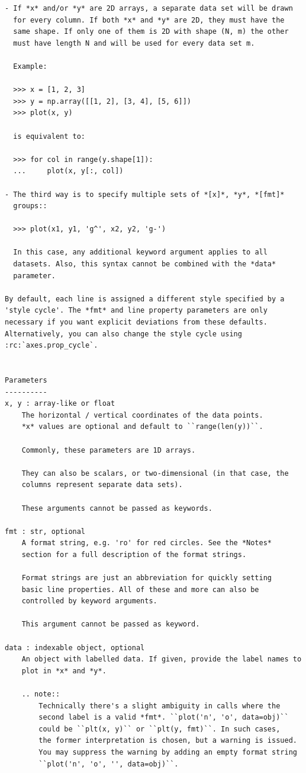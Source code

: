 \documentclass[
  letterpaper,
  DIV=11,
  numbers=noendperiod]{scrreprt}
\begin{document}
\begin{verbatim}
- If *x* and/or *y* are 2D arrays, a separate data set will be drawn
  for every column. If both *x* and *y* are 2D, they must have the
  same shape. If only one of them is 2D with shape (N, m) the other
  must have length N and will be used for every data set m.

  Example:

  >>> x = [1, 2, 3]
  >>> y = np.array([[1, 2], [3, 4], [5, 6]])
  >>> plot(x, y)

  is equivalent to:

  >>> for col in range(y.shape[1]):
  ...     plot(x, y[:, col])

- The third way is to specify multiple sets of *[x]*, *y*, *[fmt]*
  groups::

  >>> plot(x1, y1, 'g^', x2, y2, 'g-')

  In this case, any additional keyword argument applies to all
  datasets. Also, this syntax cannot be combined with the *data*
  parameter.

By default, each line is assigned a different style specified by a
'style cycle'. The *fmt* and line property parameters are only
necessary if you want explicit deviations from these defaults.
Alternatively, you can also change the style cycle using
:rc:`axes.prop_cycle`.


Parameters
----------
x, y : array-like or float
    The horizontal / vertical coordinates of the data points.
    *x* values are optional and default to ``range(len(y))``.

    Commonly, these parameters are 1D arrays.

    They can also be scalars, or two-dimensional (in that case, the
    columns represent separate data sets).

    These arguments cannot be passed as keywords.

fmt : str, optional
    A format string, e.g. 'ro' for red circles. See the *Notes*
    section for a full description of the format strings.

    Format strings are just an abbreviation for quickly setting
    basic line properties. All of these and more can also be
    controlled by keyword arguments.

    This argument cannot be passed as keyword.

data : indexable object, optional
    An object with labelled data. If given, provide the label names to
    plot in *x* and *y*.

    .. note::
        Technically there's a slight ambiguity in calls where the
        second label is a valid *fmt*. ``plot('n', 'o', data=obj)``
        could be ``plt(x, y)`` or ``plt(y, fmt)``. In such cases,
        the former interpretation is chosen, but a warning is issued.
        You may suppress the warning by adding an empty format string
        ``plot('n', 'o', '', data=obj)``.


\end{verbatim}
\end{document}
